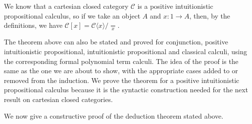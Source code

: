 \begin{example}
    We know that a cartesian closed category $\mathcal C$ is a positive intuitionistic propositional calculus, so if we take an object $A$ and $x : 1 \to A$, then,
    by the definitions, we have $\mathcal C[x] = \mathcal C\langle x\rangle / \underset{x}{=}$.
\end{example}

\begin{remark}
    The theorem above can also be stated and proved for conjunction, positive intuitionistic propositional, intuitionistic propositional and classical calculi, using the corresponding formal polynomial term calculi.
    The idea of the proof is the same as the one we are about to show, with the appropriate cases added to or removed from the induction.\newline
    We prove the theorem for a positive intuitionistic propositional calculus because it is the syntactic construction needed for the next result on cartesian closed categories.
\end{remark}

We now give a constructive proof of the deduction theorem stated above.

